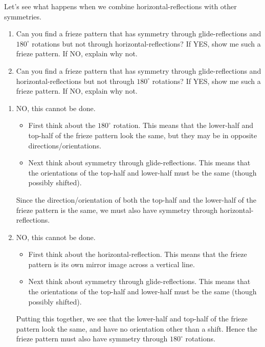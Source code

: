 \documentclass[noauthor,nooutcomes,hints,handout]{ximera}
\begin{document}
\begin{question}
  Let's see what happens when we combine horizontal-reflections with
  other symmetries.
  \begin{enumerate}
  \item Can you find a frieze pattern that has symmetry through
    glide-reflections and $180^\circ$ rotations but not through
    horizontal-reflections? If YES, show me such a frieze pattern. If
    NO, explain why not.
  \item Can you find a frieze pattern that has symmetry through
    glide-reflections and horizontal-reflections but not through
    $180^\circ$ rotations? If YES, show me such a frieze pattern. If
    NO, explain why not.
  \end{enumerate}
    
  \begin{freeResponse}
    \begin{enumerate}
    \item NO, this cannot be done.
      \begin{itemize}
      \item First think about the $180^\circ$ rotation. This means
        that the lower-half and top-half of the frieze pattern look
        the same, but they may be in opposite directions/orientations.
      \item Next think about symmetry through glide-reflections. This
        means that the orientations of the top-half and lower-half
        must be the same (though possibly shifted).
      \end{itemize}
      Since the direction/orientation of both the top-half and the
      lower-half of the frieze pattern is the same, we must also have
      symmetry through horizontal-reflections.
    \item NO, this cannot be done.
      \begin{itemize}
      \item First think about the horizontal-reflection. This means
        that the frieze pattern is its own mirror image across a
        vertical line. 
      \item Next think about symmetry through glide-reflections. This
        means that the orientations of the top-half and lower-half
        must be the same (though possibly shifted).
      \end{itemize}
      Putting this together, we see that the lower-half and top-half
      of the frieze pattern look the same, and have no orientation
      other than a shift. Hence the frieze pattern must also have
      symmetry through $180^\circ$ rotations.
    \end{enumerate}
  \end{freeResponse}
\end{question}
\mynewpage
\end{document}
